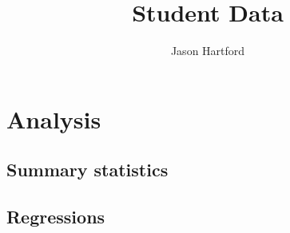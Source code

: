 \documentclass{article}\usepackage{graphicx, color}
\begin{document}
\date{}






\title{Student Data}


\author{Jason Hartford}

\maketitle

\section{Analysis}
\subsection{Summary statistics}



\subsection{Regressions}
\end{document}
